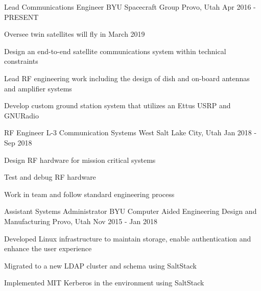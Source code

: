 

\begin{cventries}
    \cventry
    {Lead Communications Engineer} %
    {BYU Spacecraft Group} %
    {Provo, Utah} %
    {Apr 2016 - PRESENT} %
    {
        \begin{cvitems} %
        \item {Oversee twin satellites will fly in March 2019}
        \item {Design an end-to-end satellite communications system within technical constraints}
        \item {Lead RF engineering work including the design of dish and on-board antennas and amplifier systems}
        \item {Develop custom ground station system that utilizes an Ettus USRP and GNURadio}
        \end{cvitems}
    }

    \cventry
    {RF Engineer} %
    {L-3 Communication Systems West} %
    {Salt Lake City, Utah} %
    {Jan 2018 - Sep 2018} %
    {
        \begin{cvitems} %
        \item {Design RF hardware for mission critical systems}
        \item {Test and debug RF hardware}
        \item {Work in team and follow standard engineering process}
        \end{cvitems}
    }

    \cventry
    {Assistant Systems Administrator} %
    {BYU Computer Aided Engineering Design and Manufacturing} %
    {Provo, Utah} %
    {Nov 2015 - Jan 2018} %
    {
        \begin{cvitems} %
        \item {Developed Linux infrastructure to maintain storage, enable authentication and enhance the user experience}
        \item {Migrated to a new LDAP cluster and schema using SaltStack}
        \item {Implemented MIT Kerberos in the environment using SaltStack}
        \end{cvitems}
    }


\end{cventries}

